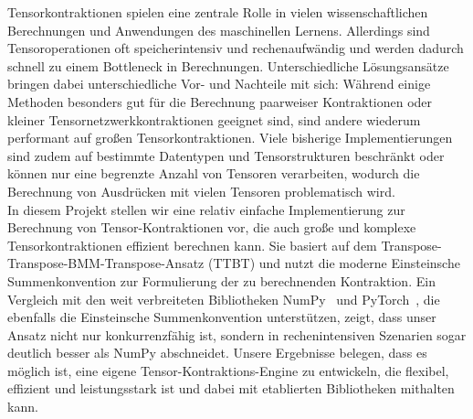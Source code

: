 Tensorkontraktionen spielen eine zentrale Rolle in vielen wissenschaftlichen Berechnungen und Anwendungen des maschinellen Lernens. Allerdings sind Tensoroperationen oft speicherintensiv und rechenaufwändig und werden dadurch schnell zu einem Bottleneck in Berechnungen. 
Unterschiedliche Lösungsansätze bringen dabei unterschiedliche Vor- und Nachteile mit sich: Während einige Methoden besonders gut für die Berechnung paarweiser Kontraktionen oder kleiner Tensornetzwerkkontraktionen geeignet sind, sind andere wiederum performant auf großen Tensorkontraktionen.
Viele bisherige Implementierungen sind zudem auf bestimmte Datentypen und Tensorstrukturen beschränkt oder können nur eine begrenzte Anzahl von Tensoren verarbeiten, wodurch die Berechnung von Ausdrücken mit vielen Tensoren problematisch wird.\\

\noindent In diesem Projekt stellen wir eine relativ einfache Implementierung zur Berechnung von Tensor-Kontraktionen vor, die auch große und komplexe Tensorkontraktionen effizient berechnen kann. Sie basiert auf dem Transpose-Transpose-BMM-Transpose-Ansatz (TTBT) und nutzt die moderne Einsteinsche Summenkonvention zur Formulierung der zu berechnenden Kontraktion.
Ein Vergleich mit den weit verbreiteten Bibliotheken NumPy~\cite{Numpy} und PyTorch~\cite{PyTorch}, die ebenfalls die Einsteinsche Summenkonvention unterstützen, zeigt, dass unser Ansatz nicht nur konkurrenzfähig ist, sondern in rechenintensiven Szenarien sogar deutlich besser als NumPy abschneidet. Unsere Ergebnisse belegen, dass es möglich ist, eine eigene Tensor-Kontraktions-Engine zu entwickeln, die flexibel, effizient und leistungsstark ist und dabei mit etablierten Bibliotheken mithalten kann.